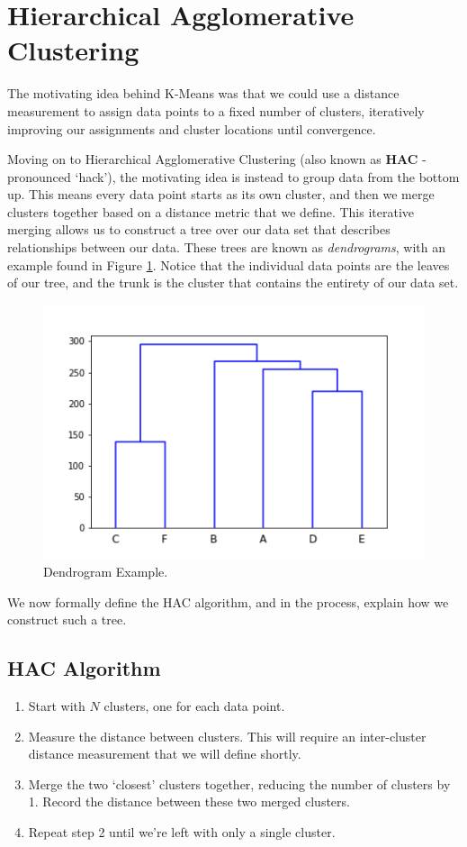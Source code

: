 \section{Hierarchical Agglomerative Clustering}
The motivating idea behind K-Means was that we could use a distance measurement to assign data points to a fixed number of clusters, iteratively improving our assignments and cluster locations until convergence.

Moving on to Hierarchical Agglomerative Clustering (also known as \textbf{HAC} - pronounced `hack'), the motivating idea is instead to group data from the bottom up. This means every data point starts as its own cluster, and then we merge clusters together based on a distance metric that we define. This iterative merging allows us to construct a tree over our data set that describes relationships between our data. These trees are known as \textit{dendrograms}, with an example found in Figure \ref{fig:dendrogram-example}. Notice that the individual data points are the leaves of our tree, and the trunk is the cluster that contains the entirety of our data set.

\begin{figure}
    \centering
    \includegraphics[width=0.5\paperwidth]{../Clustering/fig/dendrogram-example.png}
    \caption{Dendrogram Example.}
    \label{fig:dendrogram-example}
\end{figure}

We now formally define the HAC algorithm, and in the process, explain how we construct such a tree.

\subsection{HAC Algorithm}
\begin{enumerate}
    \item Start with $N$ clusters, one for each data point.
    \item Measure the distance between clusters. This will require an inter-cluster distance measurement that we will define shortly.
    \item Merge the two `closest' clusters together, reducing the number of clusters by 1. Record the distance between these two merged clusters.
    \item Repeat step 2 until we're left with only a single cluster.
\end{enumerate}

